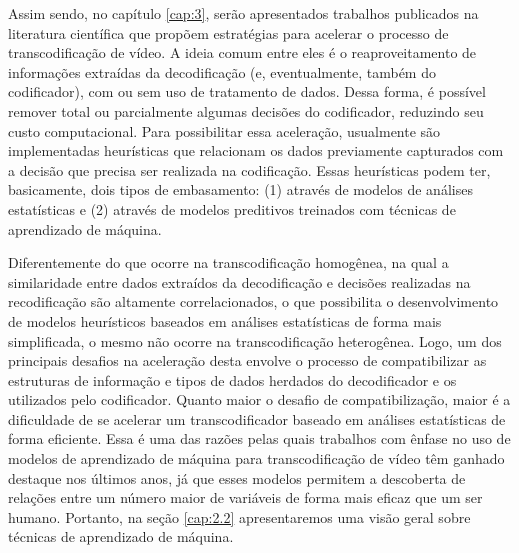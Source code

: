 Assim sendo, no capítulo \ref{cap:3}, serão apresentados trabalhos publicados na literatura científica que propõem estratégias para acelerar o processo de transcodificação de vídeo. A ideia comum entre eles é o reaproveitamento de informações extraídas da decodificação (e, eventualmente, também do codificador), com ou sem uso de tratamento de dados. Dessa forma, é possível remover total ou parcialmente algumas decisões do codificador, reduzindo seu custo computacional. Para possibilitar essa aceleração, usualmente são implementadas heurísticas que relacionam os dados previamente capturados com a decisão que precisa ser realizada na codificação. Essas heurísticas podem ter, basicamente, dois tipos de embasamento: (1) através de modelos de análises estatísticas e (2) através de modelos preditivos treinados com técnicas de aprendizado de máquina. 

Diferentemente do que ocorre na transcodificação homogênea, na qual a similaridade entre dados extraídos da decodificação e decisões realizadas na recodificação são altamente correlacionados, o que possibilita o desenvolvimento de modelos heurísticos baseados em análises estatísticas de forma mais simplificada, o mesmo não ocorre na transcodificação heterogênea. Logo, um dos principais desafios na aceleração desta envolve o processo de compatibilizar as estruturas de informação e tipos de dados herdados do decodificador e os utilizados pelo codificador. Quanto maior o desafio de compatibilização, maior é a dificuldade de se acelerar um transcodificador baseado em análises estatísticas de forma eficiente. Essa é uma das razões pelas quais trabalhos com ênfase no uso de modelos de aprendizado de máquina para transcodificação de vídeo têm ganhado destaque nos últimos anos, já que esses modelos permitem a descoberta de relações entre um número maior de variáveis de forma mais eficaz que um ser humano. Portanto, na seção \ref{cap:2.2} apresentaremos uma visão geral sobre técnicas de aprendizado de máquina.
